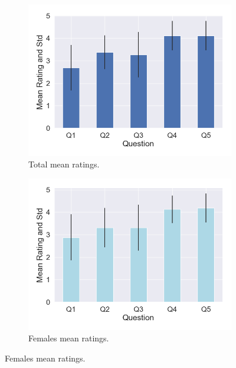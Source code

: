\begin{figure}[H]
\hspace{-15mm}
\begin{subfigure}[b]{0.3\textwidth}
 \centering
 \includegraphics[scale=0.33]{Files/Plots/presence_mean_ratings.png}
 \caption{Total mean ratings. }
 \label{fig:presAll}
 \end{subfigure}
 \hspace{10mm}
\begin{subfigure}[b]{0.3\textwidth}
 \centering
 \includegraphics[scale=0.33]{Files/Plots/presence_mean_ratings_f.png}
 \caption{Females mean ratings.}
 \label{fig:presFemale}

\end{subfigure}
\end{figure}
